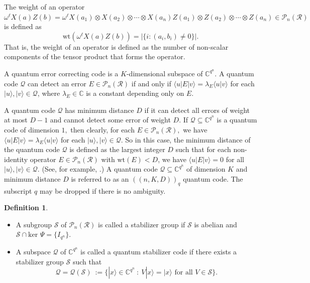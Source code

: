 \documentclass{article}
\theoremstyle{remark}
\theoremstyle{definition}
\newtheorem{defin}{Definition}[section]
\numberwithin{equation}{section}
\begin{document}
 The weight of an operator $\omega^\ell X(a)Z(b)=\omega^\ell X(a_1)\otimes X(a_2)\otimes \cdots\otimes X(a_n)Z(a_1)\otimes Z(a_2)\otimes \cdots\otimes Z(a_n) \in \mathcal{P}_n(\mathcal{R})$ is defined as 
 $$\text{wt}(\omega^\ell X(a)Z(b))=|\{ i : (a_i,b_i) \neq 0\}|.$$
 That is, the weight of an operator is defined as the number of non-scalar components of the tensor product that forms the operator.
 
A quantum error correcting code is a $K$-dimensional subspace of $\mathbb{C}^{q^n}.$
A quantum code $\mathcal{Q}$ can detect an error $E \in \mathcal{P}_n(\mathcal{R})$ if and only if  $\langle u | E | v \rangle=\lambda_E\langle u  | v \rangle$ for each $|u \rangle,|v \rangle \in \mathcal{Q}$, where $\lambda_E \in \mathbb{C}$ is a constant depending only on $E$.


 A quantum code $\mathcal{Q}$ has minimum distance $D$ if it can detect all errors of weight at most $D-1$ and cannot detect some error of weight $D$. If $\mathcal{Q} \subseteq \mathbb{C}^{q^n}$ is a quantum code  of dimension $1,$ then clearly, for each  $E \in \mathcal{P}_n(\mathcal{R}),$ we have $\langle u | E | v \rangle=\lambda_E\langle u  | v \rangle$ for each $|u \rangle,|v \rangle \in \mathcal{Q}.$ So in this case, the minimum distance of the quantum code $\mathcal{Q}$ is defined as the largest integer $D$ such that for each non-identity operator $E \in \mathcal{P}_n(\mathcal{R})$ with $\text{wt}(E) < D$, we have $\langle u | E | v \rangle=0$ for all $|u \rangle,|v \rangle \in \mathcal{Q}$. (See, for example, \cite{DG04}.) A quantum code $\mathcal{Q} \subseteq \mathbb{C}^{q^n}$ of dimension $K$ and minimum distance $D$ is referred to as an $((n,K,D))_q$ quantum code. The subscript $q$ may be dropped if there is no ambiguity.

\begin{defin}\cite{luerssen} \begin{itemize}\item[(a)] A subgroup $\mathcal{S}$ of $\mathcal{P}_n(\mathcal{R})$ is called a stabilizer group if 
$\mathcal{S}$ is abelian and $\mathcal{S}  \cap \text{ker } \Psi= \{I_{q{^{n}}}\}.$
\item[(b)] A subspace $\mathcal{Q}$ of $\mathbb{C}^{q^n}$ is called a quantum stabilizer code if there exists a stabilizer group $\mathcal{S}$ such that
$$\mathcal{Q}=\mathcal{Q}(\mathcal{S})~:= \{| x\rangle \in \mathbb{C}^{q^n} ~:~ V | x\rangle =| x\rangle \text{~for all~} V \in \mathcal{S}\}.$$
\end{itemize}
\end{defin}
\end{document}

